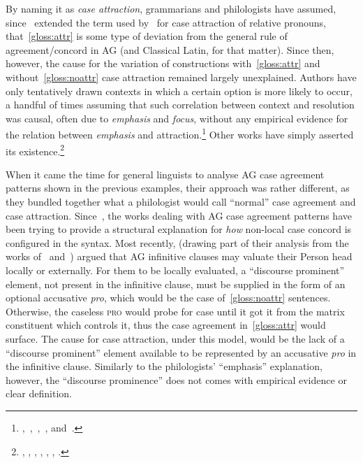 \documentclass[a4paper, 12pt, article]{memoir}
\begin{document}
By naming it as \emph{case attraction}, grammarians and philologists have
assumed, since~\textcite{Lancelot1658,Lancelot1709} extended the term used
by~\textcite{Sanchez1587} for case attraction of relative pronouns,
that~\ref{gloss:attr} is some type of deviation from the general rule
of agreement\slash{}concord in AG (and Classical Latin, for that matter).
Since then, however, the cause for the variation of constructions with~\ref{gloss:attr} and
without~\ref{gloss:noattr} case attraction remained largely unexplained.
Authors have only tentatively drawn contexts in which a certain option is more
likely to occur, a handful of times assuming that such correlation between
context and resolution was causal, often due to \emph{emphasis} and
\emph{focus}, without any empirical evidence for the relation between
\emph{emphasis} and attraction.\footnote{%
	\textcite[462]{Buttmann1826},~\textcite{Hocheder1833},~\textcite[II pp.\
		24ff.]{KG},~\textcite[774]{Cooper1997},
	and~\textcite[2500--1]{Cooper2002}.
}
Other works have simply asserted its existence.\footnote{
	\textcite[203]{Goodwin1900},
	\textcite[643]{Stahl1907},
	\textcite[II p.\ 368]{Schwyzer1950},
	\textcite[p.\ 278, p.\ 440]{Smyth1956},
	\textcite[105]{Rijksbaron2002},
	\textcite{Napoli2014},
	\textcite[587]{Boas2019}.
}

When it came the time for general linguists to analyse AG case agreement
patterns shown in the previous examples, their approach was rather
different, as they bundled together what a philologist would call ``normal''
case agreement and case attraction.
Since~\textcite{Lakoff1970,Andrews1971,Quicoli1982}, the works dealing with AG
case agreement patterns have been trying to provide a structural explanation for
\emph{how} non-local case concord is configured in the syntax.
Most recently, \textcite{Sevdali2013,Sevdali2013b} (drawing part of their
analysis from the works of~\cite{Tantalou2003} and~\cite{Spyropoulos2005})
argued that AG infinitive clauses may valuate their Person head locally or
externally.
For them to be locally evaluated, a ``discourse prominent'' element, not present
in the infinitive clause, must be supplied in the form of an optional accusative
\emph{pro}, which would be the case of~\ref{gloss:noattr} sentences.
Otherwise, the caseless \textsc{pro} would probe for case until it got it from
the matrix constituent which controls it, thus the case agreement
in~\ref{gloss:attr} would surface.
The cause for case attraction, under this model, would be the lack of a
``discourse prominent'' element available to be represented by an accusative
\emph{pro} in the infinitive clause.
Similarly to the philologists' ``emphasis'' explanation, however, the
``discourse prominence'' does not comes with empirical evidence or clear
definition.
\end{document}
